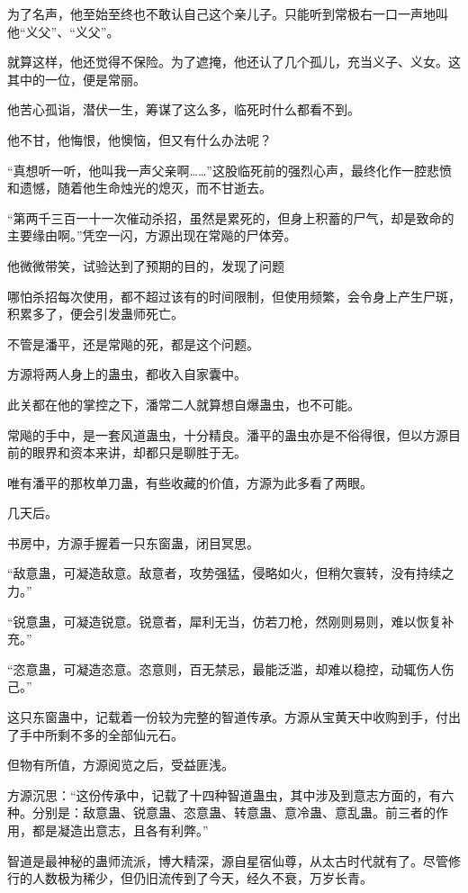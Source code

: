\begin{this_body}
为了名声，他至始至终也不敢认自己这个亲儿子。只能听到常极右一口一声地叫他“义父”、“义父”。

就算这样，他还觉得不保险。为了遮掩，他还认了几个孤儿，充当义子、义女。这其中的一位，便是常丽。

他苦心孤诣，潜伏一生，筹谋了这么多，临死时什么都看不到。

他不甘，他悔恨，他懊恼，但又有什么办法呢？

“真想听一听，他叫我一声父亲啊……”这股临死前的强烈心声，最终化作一腔悲愤和遗憾，随着他生命烛光的熄灭，而不甘逝去。

“第两千三百一十一次催动杀招，虽然是累死的，但身上积蓄的尸气，却是致命的主要缘由啊。”凭空一闪，方源出现在常飚的尸体旁。

他微微带笑，试验达到了预期的目的，发现了问题

哪怕杀招每次使用，都不超过该有的时间限制，但使用频繁，会令身上产生尸斑，积累多了，便会引发蛊师死亡。

不管是潘平，还是常飚的死，都是这个问题。

方源将两人身上的蛊虫，都收入自家囊中。

此关都在他的掌控之下，潘常二人就算想自爆蛊虫，也不可能。

常飚的手中，是一套风道蛊虫，十分精良。潘平的蛊虫亦是不俗得很，但以方源目前的眼界和资本来讲，却都只是聊胜于无。

唯有潘平的那枚单刀蛊，有些收藏的价值，方源为此多看了两眼。

几天后。

书房中，方源手握着一只东窗蛊，闭目冥思。

“敌意蛊，可凝造敌意。敌意者，攻势强猛，侵略如火，但稍欠寰转，没有持续之力。”

“锐意蛊，可凝造锐意。锐意者，犀利无当，仿若刀枪，然刚则易则，难以恢复补充。”

“恣意蛊，可凝造恣意。恣意则，百无禁忌，最能泛滥，却难以稳控，动辄伤人伤己。”

这只东窗蛊中，记载着一份较为完整的智道传承。方源从宝黄天中收购到手，付出了手中所剩不多的全部仙元石。

但物有所值，方源阅览之后，受益匪浅。

方源沉思：“这份传承中，记载了十四种智道蛊虫，其中涉及到意志方面的，有六种。分别是：敌意蛊、锐意蛊、恣意蛊、转意蛊、意冷蛊、意乱蛊。前三者的作用，都是凝造出意志，且各有利弊。”

智道是最神秘的蛊师流派，博大精深，源自星宿仙尊，从太古时代就有了。尽管修行的人数极为稀少，但仍旧流传到了今天，经久不衰，万岁长青。


\end{this_body}

